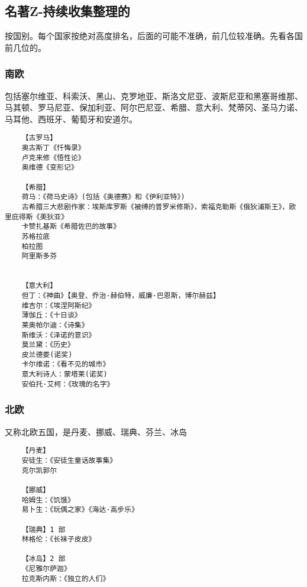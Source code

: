 \documentclass[UTF8]{../RepresentationUniverse}
\begin{document}
\subsection{名著Z-持续收集整理的}

按国别。每个国家按绝对高度排名，后面的可能不准确，前几位较准确。先看各国前几位的。

\subsubsection{南欧}
包括塞尔维亚、科索沃、黑山、克罗地亚、斯洛文尼亚、波斯尼亚和黑塞哥维那、马其顿、罗马尼亚、保加利亚、阿尔巴尼亚、希腊、意大利、梵蒂冈、圣马力诺、马耳他、西班牙、葡萄牙和安道尔。
\begin{lstlisting}
    【古罗马】
    奥古斯丁《忏悔录》
    卢克来修《悟性论》
    奥维德《变形记》
    
    【希腊】
    荷马：《荷马史诗》(包括《奥德赛》和《伊利亚特》) 
    古希腊三大悲剧作家：埃斯库罗斯《被缚的普罗米修斯》，索福克勒斯《俄狄浦斯王》，欧里庇得斯《美狄亚》
    卡赞扎基斯《希腊佐巴的故事》
    苏格拉底
    柏拉图
    阿里斯多芬
    
    
    【意大利】
    但丁：《神曲》【奥登、乔治·赫伯特，威廉·巴恩斯，博尔赫兹】
    维吉尔：《埃涅阿斯纪》
    薄伽丘：《十日谈》
    莱奥帕尔迪：《诗集》
    斯维沃：《泽诺的意识》
    莫兰黛：《历史》
    皮兰德娄(诺奖) 
    卡尔维诺：《看不见的城市》
    意大利诗人：蒙塔莱(诺奖) 
    安伯托·艾柯：《玫瑰的名字》
\end{lstlisting}




\subsubsection{北欧}
又称北欧五国，是丹麦、挪威、瑞典、芬兰、冰岛
\begin{lstlisting}
    【丹麦】
    安徒生：《安徒生童话故事集》
    克尔凯郭尔

    【挪威】
    哈姆生：《饥饿》
    易卜生：《玩偶之家》《海达·高步乐》
    
    【瑞典】1 部
    林格伦：《长袜子皮皮》
    
    【冰岛】2 部
    《尼雅尔萨迦》
    拉克斯内斯：《独立的人们》
\end{lstlisting}
\end{document}
